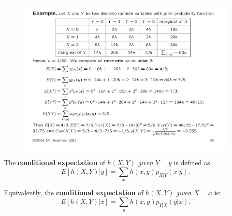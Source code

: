 \documentclass[notes=show,handout]{beamer}\usepackage[]{graphicx}\usepackage[]{color}
\begin{document}
\begin{frame}{\secname}
  \begin{example}
  \begin{figure}[ptb]\centering
  \includegraphics[scale = 0.35]{img/ex_tot.pdf}
  \end{figure}
  \end{example}
\end{frame}

\begin{frame}{\secname}

  \begin{definition}
  The \textbf{conditional expectation} of $h\left( X,Y\right) $
  \emph{given} $Y=y$ is defined as%
  \begin{equation*}
  E\left[ h\left( X,Y\right) |y\right] =\sum_{x}h\left( x,y\right)
  p_{X|Y}\left( x|y\right).
  \end{equation*}

  \end{definition}
  Equivalently, the \textbf{conditional expectation }of $h\left( X,Y\right) $
  \emph{given} $X=x$ is:
  \begin{equation*}
  E\left[ h\left( X,Y\right) |x\right] =\sum_{y}h\left( x,y\right)
  p_{Y|X}\left( y|x\right).
  \end{equation*}
\end{frame}
\end{document}
